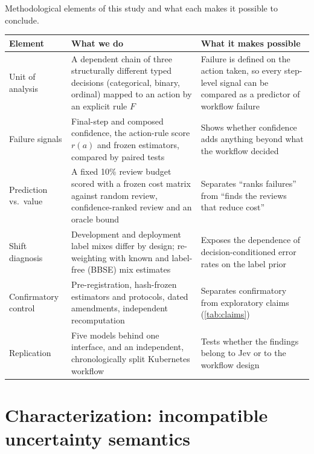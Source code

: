 \begin{widetable}
\centering
\caption{Methodological elements of this study and what each makes it
possible to conclude.}
\label{tab:novelty}
\small
\begin{tabularx}{\linewidth}{l Y Y}
\toprule
Element & What we do & What it makes possible \\
\midrule
Unit of analysis & A dependent chain of three structurally different typed decisions (categorical, binary, ordinal) mapped to an action by an explicit rule $F$ & Failure is defined on the action taken, so every step-level signal can be compared as a predictor of workflow failure \\ \addlinespace
Failure signals & Final-step and composed confidence, the action-rule score $r(a)$ and frozen estimators, compared by paired tests & Shows whether confidence adds anything beyond what the workflow decided \\ \addlinespace
Prediction vs.\ value & A fixed 10\% review budget scored with a frozen cost matrix against random review, confidence-ranked review and an oracle bound & Separates ``ranks failures'' from ``finds the reviews that reduce cost'' \\ \addlinespace
Shift diagnosis & Development and deployment label mixes differ by design; re-weighting with known and label-free (BBSE) mix estimates & Exposes the dependence of decision-conditioned error rates on the label prior \\ \addlinespace
Confirmatory control & Pre-registration, hash-frozen estimators and protocols, dated amendments, independent recomputation & Separates confirmatory from exploratory claims (\cref{tab:claims}) \\ \addlinespace
Replication & Five models behind one interface, and an independent, chronologically split Kubernetes workflow & Tests whether the findings belong to Jev or to the workflow design \\
\bottomrule
\end{tabularx}
\end{widetable}

\section{Characterization: incompatible uncertainty semantics}
\label{sec:char}


